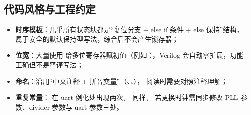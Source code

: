 \subsection{代码风格与工程约定}

\begin{itemize}[leftmargin=2em,itemsep=2pt]
  \item \textbf{时序模板}：几乎所有状态块都是“复位分支 + else if 条件 + else 保持”结构，
        属于安全的默认保持型写法，综合后不会产生锁存器；
  \item \textbf{位宽}：大量使用  给多位寄存器赋初值（例如
        ），Verilog 会自动零扩展，功能正确但不是严谨写法；
  \item \textbf{命名}：沿用“中文注释 + 拼音变量”（、、），
        阅读时需要对照注释理解；
  \item \textbf{重复常量}： 在 uart 例化处出现两次， 同样，
        若更换时钟需同步修改 PLL 参数、divider 参数与 uart 参数三处。
\end{itemize}
